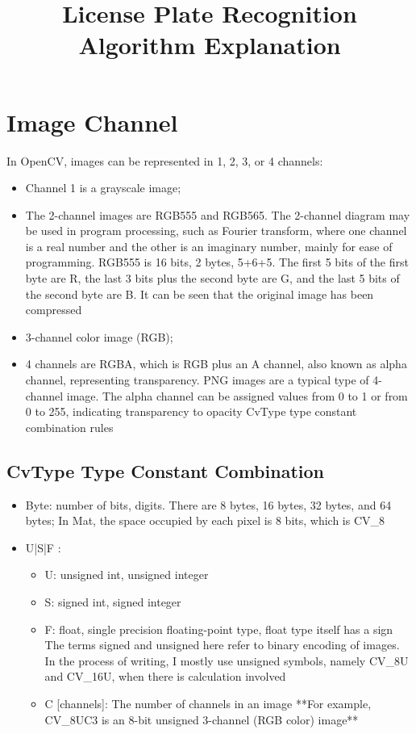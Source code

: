 \documentclass{article}
\title{License Plate Recognition Algorithm Explanation}
\begin{document}
	\maketitle
	
	\section{Image Channel}
	In OpenCV, images can be represented in 1, 2, 3, or 4 channels:
	\begin{itemize}
		\item Channel 1 is a grayscale image;
		\item The 2-channel images are RGB555 and RGB565. The 2-channel diagram may be used in program processing, such as Fourier transform, where one channel is a real number and the other is an imaginary number, mainly for ease of programming. RGB555 is 16 bits, 2 bytes, 5+6+5. The first 5 bits of the first byte are R, the last 3 bits plus the second byte are G, and the last 5 bits of the second byte are B. It can be seen that the original image has been compressed
		\item 3-channel color image (RGB);
		\item 4 channels are RGBA, which is RGB plus an A channel, also known as alpha channel, representing transparency. PNG images are a typical type of 4-channel image. The alpha channel can be assigned values from 0 to 1 or from 0 to 255, indicating transparency to opacity
		CvType type constant combination rules
	\end{itemize}
	
	\subsection{CvType Type Constant Combination}
	\begin{itemize}
		\item Byte: number of bits, digits. There are 8 bytes, 16 bytes, 32 bytes, and 64 bytes; In Mat, the space occupied by each pixel is 8 bits, which is CV\_8
		\item U|S|F :
		\begin{itemize}
			\item U: unsigned int, unsigned integer
			\item S: signed int, signed integer
			\item F: float, single precision floating-point type, float type itself has a sign
			The terms signed and unsigned here refer to binary encoding of images. In the process of writing, I mostly use unsigned symbols, namely CV\_8U and CV\_16U, when there is calculation involved
			\item C [channels]: The number of channels in an image
			**For example, CV\_8UC3 is an 8-bit unsigned 3-channel (RGB color) image**
		\end{itemize}
	\end{itemize}
	
\end{document}
